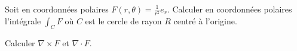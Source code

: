 
\begin{exercice}\label{exoOutilsMath-0132}

    Soit en coordonnées polaires \( F(r,\theta)=\frac{1}{ r^2 }e_r\). Calculer en coordonnées polaires l'intégrale \( \int_C F\) où \( C\) est le cercle de rayon \( R\) centré à l'origine.

    Calculer \( \nabla\times F\) et \( \nabla\cdot F\).

\end{exercice}
